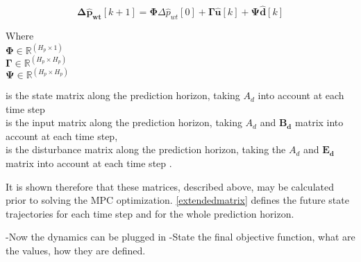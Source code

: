 \begin{equation}
	\bm{\Delta \hat p_{wt}} [k+1] = \bm{\Phi} \Delta \hat p_{wt}[0] + \bm{\Gamma \hat{u}}[k] + \bm{\Psi} \bm{\hat{d}}[k]
	\label{extendedmatrix}
\end{equation}


\begin{minipage}[t]{0.20\textwidth}
Where\\
\hspace*{8mm} $\bm{\Phi} \in \mathbb{R}^{(H_p \times 1)}$ \\
\hspace*{8mm} $\bm{\Gamma} \in \pmb{\mathbb{R}}^{(H_p \times H_p)}$ \\
\hspace*{8mm} $\bm{\Psi} \in \pmb{\mathbb{R}}^{(H_p \times H_p)}$ 
\end{minipage}
\begin{minipage}[t]{0.68\textwidth}
\vspace*{2mm}
is the state matrix along the prediction horizon, taking $A_d$ into account at each time step \\
is the input matrix along the prediction horizon, taking $A_d$ and $\bm{B_d}$ matrix into account at each time step, \\
is the disturbance matrix along the prediction horizon, taking the $A_d$ and $\bm{E_d}$ matrix into account at each time step . \\ 
\end{minipage}

It is shown therefore that these matrices, described above, may be calculated prior to solving the MPC optimization. \eqref{extendedmatrix} defines the future state trajectories for each time step and for the whole prediction horizon.



-Now the dynamics can be plugged in
-State the final objective function, what are the values, how they are defined. 